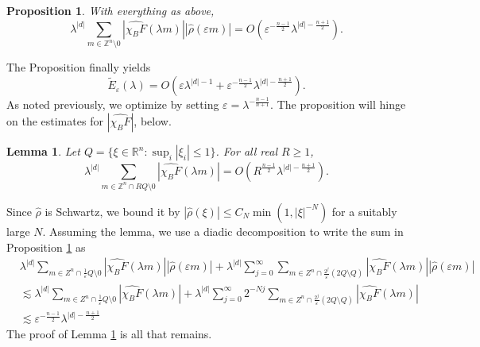 \documentclass[10pt]{amsart}
\renewcommand{\epsilon}{\varepsilon}
\newtheorem{lemma}[theorem]{Lemma}
\newtheorem{proposition}[theorem]{Proposition}
\renewcommand{\epsilon}{\varepsilon}
\newcommand{\R}{{\mathbb R}}
\newcommand{\1}{\mathbb{1}}
\newcommand{\Z}{{\mathbb Z}}
\begin{document}
\begin{proposition} \label{poisson sum proposition}
With everything as above,
\[
    \lambda^{|d|} \sum_{m \in \Z^n \setminus 0} |\widehat{\chi_{B} F}(\lambda m)| |\widehat \rho(\epsilon m)| = O(\epsilon^{-\frac{n-1}{2}} \lambda^{|d| - \frac{n+1}{2}}).
\]
\end{proposition}

The Proposition finally yields
\[
    \tilde E_\epsilon(\lambda) = O(\epsilon \lambda^{|d|-1} + \epsilon^{-\frac{n-1}{2}} \lambda^{|d|-\frac{n+1}{2}}).
\]
As noted previously, we optimize by setting $\epsilon = \lambda^{-\frac{n-1}{n+1}}$.
The proposition will hinge on the estimates for $|\widehat{\chi_B F}|$, below.

\begin{lemma} \label{fourier estimate}
    Let $Q = \{ \xi \in \R^n : \sup_{i}|\xi_i| \leq 1 \}$. For all real $R \geq 1$,
    \[
        \lambda^{|d|} \sum_{m \in \Z^n \cap R Q \setminus 0} |\widehat{\chi_B F}(\lambda m)| = O(R^{\frac{n-1}{2}}\lambda^{|d|-\frac{n+1}{2}}).
    \]
\end{lemma}

Since $\widehat \rho$ is Schwartz, we bound it by $|\widehat \rho(\xi)| \leq C_N\min(1,|\xi|^{-N})$ for a suitably large $N$. Assuming the lemma, we use a diadic decomposition to write the sum in Proposition \ref{poisson sum proposition} as
\begin{align*}
    &\lambda^{|d|} \sum_{m \in Z^n \cap \frac{1}{\epsilon} Q \setminus 0} |\widehat{\chi_B F}(\lambda m)| |\widehat \rho(\epsilon m)| + \lambda^{|d|} \sum_{j = 0}^\infty \sum_{m \in Z^n \cap \frac{2^j}{\epsilon} (2Q \setminus Q)} |\widehat{\chi_B F}(\lambda m)||\widehat{\rho}(\epsilon m)| \\
    &\lesssim \lambda^{|d|} \sum_{m \in Z^n \cap \frac{1}{\epsilon} Q \setminus 0} |\widehat{\chi_B F}(\lambda m)| + \lambda^{|d|} \sum_{j=0}^\infty 2^{-Nj} \sum_{m \in Z^n \cap \frac{2^j}{\epsilon} (2Q \setminus Q)} |\widehat{\chi_B F}(\lambda m)|\\
    &\lesssim \epsilon^{-\frac{n-1}{2}} \lambda^{|d| - \frac{n+1}{2}}
\end{align*}
The proof of Lemma \ref{fourier estimate} is all that remains.
\end{document}
